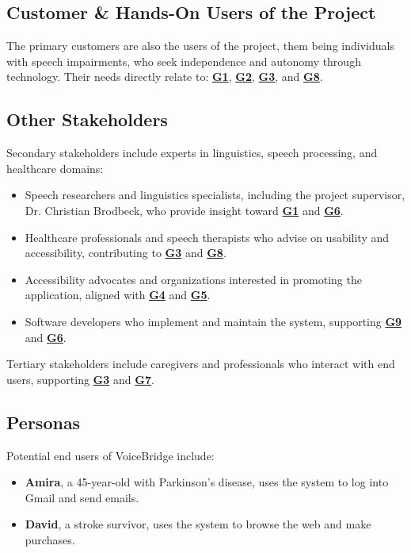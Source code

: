 \documentclass[11pt]{article}
\begin{document}
\subsection{Customer \& Hands-On Users of the Project}

The primary customers are also the users of the project, them being individuals with speech impairments, who seek independence and autonomy through technology. Their needs directly relate to: \textbf{\hyperref[tab:project-goals]{G1}}, \textbf{\hyperref[tab:project-goals]{G2}}, \textbf{\hyperref[tab:project-goals]{G3}}, and \textbf{\hyperref[tab:project-goals]{G8}}.

\subsection{Other Stakeholders}
Secondary stakeholders include experts in linguistics, speech processing, and healthcare domains:
\begin{itemize}
    \item Speech researchers and linguistics specialists, including the project supervisor, Dr. Christian Brodbeck, who provide insight toward \textbf{\hyperref[tab:project-goals]{G1}} and \textbf{\hyperref[tab:project-goals]{G6}}.
    \item Healthcare professionals and speech therapists who advise on usability and accessibility, contributing to \textbf{\hyperref[tab:project-goals]{G3}} and \textbf{\hyperref[tab:project-goals]{G8}}.
    \item Accessibility advocates and organizations interested in promoting the application, aligned with \textbf{\hyperref[tab:project-goals]{G4}} and \textbf{\hyperref[tab:project-goals]{G5}}.
    \item Software developers who implement and maintain the system, supporting \textbf{\hyperref[tab:project-goals]{G9}} and \textbf{\hyperref[tab:project-goals]{G6}}.
\end{itemize}

Tertiary stakeholders include caregivers and professionals who interact with end users, supporting \textbf{\hyperref[tab:project-goals]{G3}} and \textbf{\hyperref[tab:project-goals]{G7}}.

\subsection{Personas}

Potential end users of VoiceBridge include:
\begin{itemize}
    \item \textbf{Amira}, a 45-year-old with Parkinson’s disease, uses the system to log into Gmail and send emails.
    \item \textbf{David}, a stroke survivor, uses the system to browse the web and make purchases.
\end{itemize}
\end{document}
